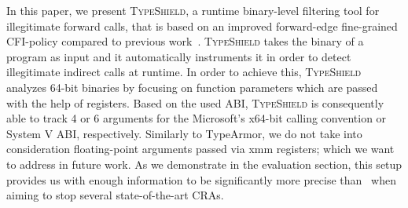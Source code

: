In this paper, we present \textsc{TypeShield}, a runtime binary-level filtering tool for illegitimate forward calls, that is based on an improved forward-edge fine-grained CFI-policy 
compared to previous work~\cite{veen:typearmor, crane:readactor++}. 
\textsc{TypeShield} takes the binary of a program as input and it automatically instruments it in order
to detect illegitimate indirect calls at runtime. In order to achieve this, 
\textsc{TypeShield} analyzes 64-bit binaries by focusing on function parameters which are passed with the 
help of registers. Based on the used ABI, \textsc{TypeShield} is consequently able to track 4 or 6 arguments for the Microsoft's x64-bit calling convention or System V ABI, 
respectively. Similarly to TypeArmor, we do not take into consideration floating-point arguments passed via xmm registers; which we want to address in future work. 
As we demonstrate in the evaluation section, this setup provides us with enough information to be significantly more precise than~\cite{veen:typearmor} when aiming to stop several state-of-the-art CRAs.




